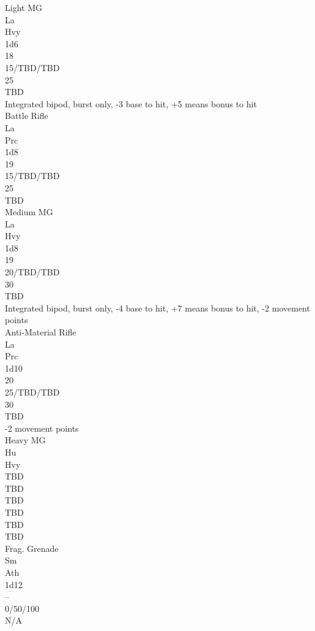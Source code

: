 \documentclass[letterpaper,titlepage,openany,twocolumn]{book}
\begin{document}
Light MG\\
La\\
Hvy\\
1d6\\
18\\
15/TBD/TBD\\
25\\
TBD\\
Integrated bipod, burst only,  -3 base to hit, +5 means bonus to hit\\
Battle Rifle\\
La\\
Prc\\
1d8\\
19\\
15/TBD/TBD\\
25\\
TBD\\

Medium MG\\
La\\
Hvy\\
1d8\\
19\\
20/TBD/TBD\\
30\\
TBD\\
Integrated bipod, burst only, -4 base to hit, +7 means bonus to hit, -2 movement points\\
Anti-Material Rifle\\
La\\
Prc\\
1d10\\
20\\
25/TBD/TBD\\
30\\
TBD\\
-2 movement points\\
Heavy MG\\
Hu\\
Hvy\\
TBD\\
TBD\\
TBD\\
TBD\\
TBD\\
TBD\\
Frag. Grenade\\
Sm\\
Ath\\
1d12\\
--\\
0/50/100\\
N/A\\
\end{document}
